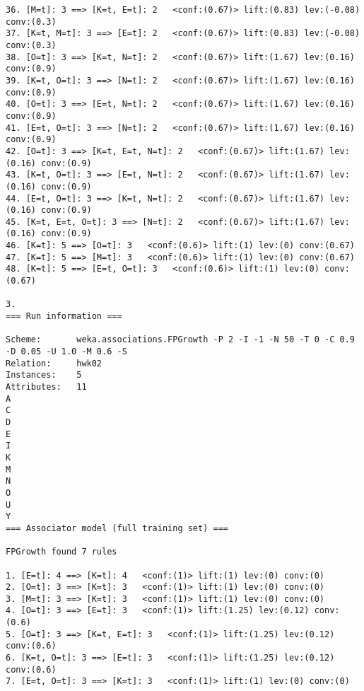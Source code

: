 \documentclass[12pt]{elsart}
\begin{document}
\begin{verbatim}
36. [M=t]: 3 ==> [K=t, E=t]: 2   <conf:(0.67)> lift:(0.83) lev:(-0.08) conv:(0.3) 
37. [K=t, M=t]: 3 ==> [E=t]: 2   <conf:(0.67)> lift:(0.83) lev:(-0.08) conv:(0.3) 
38. [O=t]: 3 ==> [K=t, N=t]: 2   <conf:(0.67)> lift:(1.67) lev:(0.16) conv:(0.9) 
39. [K=t, O=t]: 3 ==> [N=t]: 2   <conf:(0.67)> lift:(1.67) lev:(0.16) conv:(0.9) 
40. [O=t]: 3 ==> [E=t, N=t]: 2   <conf:(0.67)> lift:(1.67) lev:(0.16) conv:(0.9) 
41. [E=t, O=t]: 3 ==> [N=t]: 2   <conf:(0.67)> lift:(1.67) lev:(0.16) conv:(0.9) 
42. [O=t]: 3 ==> [K=t, E=t, N=t]: 2   <conf:(0.67)> lift:(1.67) lev:(0.16) conv:(0.9) 
43. [K=t, O=t]: 3 ==> [E=t, N=t]: 2   <conf:(0.67)> lift:(1.67) lev:(0.16) conv:(0.9) 
44. [E=t, O=t]: 3 ==> [K=t, N=t]: 2   <conf:(0.67)> lift:(1.67) lev:(0.16) conv:(0.9) 
45. [K=t, E=t, O=t]: 3 ==> [N=t]: 2   <conf:(0.67)> lift:(1.67) lev:(0.16) conv:(0.9) 
46. [K=t]: 5 ==> [O=t]: 3   <conf:(0.6)> lift:(1) lev:(0) conv:(0.67) 
47. [K=t]: 5 ==> [M=t]: 3   <conf:(0.6)> lift:(1) lev:(0) conv:(0.67) 
48. [K=t]: 5 ==> [E=t, O=t]: 3   <conf:(0.6)> lift:(1) lev:(0) conv:(0.67)

3.
=== Run information ===

Scheme:       weka.associations.FPGrowth -P 2 -I -1 -N 50 -T 0 -C 0.9 -D 0.05 -U 1.0 -M 0.6 -S
Relation:     hwk02
Instances:    5
Attributes:   11
A
C
D
E
I
K
M
N
O
U
Y
=== Associator model (full training set) ===

FPGrowth found 7 rules

1. [E=t]: 4 ==> [K=t]: 4   <conf:(1)> lift:(1) lev:(0) conv:(0) 
2. [O=t]: 3 ==> [K=t]: 3   <conf:(1)> lift:(1) lev:(0) conv:(0) 
3. [M=t]: 3 ==> [K=t]: 3   <conf:(1)> lift:(1) lev:(0) conv:(0) 
4. [O=t]: 3 ==> [E=t]: 3   <conf:(1)> lift:(1.25) lev:(0.12) conv:(0.6) 
5. [O=t]: 3 ==> [K=t, E=t]: 3   <conf:(1)> lift:(1.25) lev:(0.12) conv:(0.6) 
6. [K=t, O=t]: 3 ==> [E=t]: 3   <conf:(1)> lift:(1.25) lev:(0.12) conv:(0.6) 
7. [E=t, O=t]: 3 ==> [K=t]: 3   <conf:(1)> lift:(1) lev:(0) conv:(0)
\end{verbatim}
\end{document}
